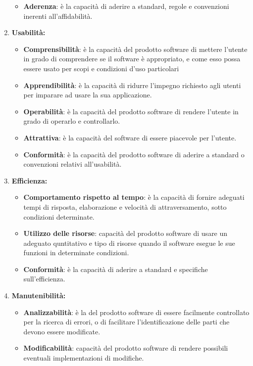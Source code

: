 \begin{enumerate}
\begin{itemize}
      \item \textbf{Aderenza}: è la capacità di aderire a standard, regole e convenzioni inerenti all'affidabilità.
    \end{itemize}
    \item \textbf{Usabilità:}
    \begin{itemize}
      \item \textbf{Comprensibilità}: è la capacità del prodotto software di mettere l'utente in grado di comprendere se il software è appropriato, e come esso possa essere usato per scopi e condizioni d'uso particolari
      \item \textbf{Apprendibilità}: è la capacità di ridurre l'impegno richiesto agli utenti per imparare ad usare la sua applicazione.
      \item \textbf{Operabilità}: è la capacità del prodotto software di rendere l'utente in grado di operarlo e controllarlo.
      \item \textbf{Attrattiva}: è la capacità del software di essere piacevole per l'utente.
      \item \textbf{Conformità}: è la capacità del prodotto software di aderire a standard o convenzioni relativi all'usabilità.
    \end{itemize}
    \item \textbf{Efficienza:}
    \begin{itemize}
      \item \textbf{Comportamento rispetto al tempo}: è la capacità di fornire adeguati tempi di risposta, elaborazione e velocità di attraversamento, sotto condizioni determinate.
      \item \textbf{Utilizzo delle risorse}: capacità del prodotto software di usare un adeguato quntitativo e tipo di risorse quando il software esegue le sue funzioni in determinate condizioni.
      \item \textbf{Conformità}: è la capacità di aderire a standard e specifiche sull'efficienza.
    \end{itemize}
    \item \textbf{Manutenibilità:}
    \begin{itemize}
      \item \textbf{Analizzabilità}: è la del prodotto software di essere facilmente controllato per la ricerca di errori, o di facilitare l'identificazione delle parti che devono essere modificate.
      \item \textbf{Modificabilità}: capacità del prodotto software di rendere possibili eventuali implementazioni di modifiche.

\end{itemize}
\end{enumerate}

